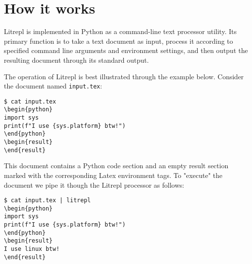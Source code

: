 \documentclass[a4paper,12pt,twocolumn]{article}
\begin{document}
\section{How it works}

Litrepl is implemented in Python as a command-line text processor utility. Its
primary function is to take a text document as input, process it according to
specified command line arguments and environment settings, and then output the
resulting document through its standard output.

The operation of Litrepl is best illustrated through the example below. Consider
the document named \verb|input.tex|:

\begin{comment}
\begin{sh}
echo '\begin{verbatim}'
echo '$ cat input.tex'
cat input.tex
echo '\end{verbatim}'
\end{sh}
\end{comment}
\begin{verbatim}
$ cat input.tex
\begin{python}
import sys
print(f"I use {sys.platform} btw!")
\end{python}
\begin{result}
\end{result}
\end{verbatim}

This document contains a Python code section and an empty result section marked
with the corresponding Latex environment tags. To "execute" the document we
pipe it though the Litrepl processor as follows:

\begin{comment}
\begin{sh}
echo '\begin{verbatim}'
echo '$ cat input.tex | litrepl'
echo "sys.platform='linux'" | litrepl repl python >/dev/null
cat input.tex | litrepl
echo '\end{verbatim}'
\end{sh}
\end{comment}
\begin{verbatim}
$ cat input.tex | litrepl
\begin{python}
import sys
print(f"I use {sys.platform} btw!")
\end{python}
\begin{result}
I use linux btw!
\end{result}
\end{verbatim}
\end{document}
